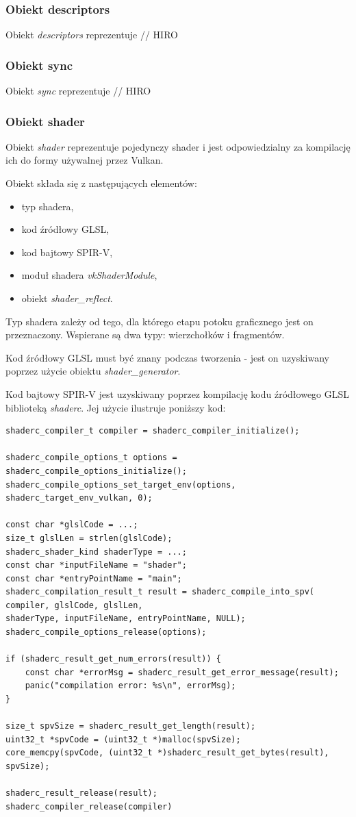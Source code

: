 \subsubsection{Obiekt descriptors}
Obiekt \textit{descriptors} reprezentuje 
// HIRO

\subsubsection{Obiekt sync}
Obiekt \textit{sync} reprezentuje 
// HIRO

\subsubsection{Obiekt shader}
Obiekt \textit{shader} reprezentuje pojedynczy shader i jest odpowiedzialny za kompilację ich do formy używalnej przez Vulkan.

Obiekt składa się z następujących elementów:
\begin{itemize}
	\item typ shadera,
	\item kod źródłowy GLSL,
	\item kod bajtowy SPIR-V,
	\item moduł shadera \textit{vkShaderModule},
	\item obiekt \textit{shader\_reflect}.
\end{itemize}

Typ shadera zależy od tego, dla którego etapu potoku graficznego jest on przeznaczony.
Wspierane są dwa typy: wierzchołków i fragmentów.

Kod źródłowy GLSL must być znany podczas tworzenia - jest on uzyskiwany poprzez użycie obiektu \textit{shader\_generator}.

Kod bajtowy SPIR-V jest uzyskiwany poprzez kompilację kodu źródłowego GLSL biblioteką \textit{shaderc}.
Jej użycie ilustruje poniższy kod:
\lstset{language=C}
\begin{lstlisting}[caption={Kompilacja kodu źródłowego GLSL biblioteką \textit{shaderc}},captionpos=b]
shaderc_compiler_t compiler = shaderc_compiler_initialize();

shaderc_compile_options_t options = shaderc_compile_options_initialize();
shaderc_compile_options_set_target_env(options, shaderc_target_env_vulkan, 0);

const char *glslCode = ...;
size_t glslLen = strlen(glslCode);
shaderc_shader_kind shaderType = ...;
const char *inputFileName = "shader";
const char *entryPointName = "main";
shaderc_compilation_result_t result = shaderc_compile_into_spv(
compiler, glslCode, glslLen,
shaderType, inputFileName, entryPointName, NULL);
shaderc_compile_options_release(options);

if (shaderc_result_get_num_errors(result)) {
	const char *errorMsg = shaderc_result_get_error_message(result);
	panic("compilation error: %s\n", errorMsg);
}

size_t spvSize = shaderc_result_get_length(result);
uint32_t *spvCode = (uint32_t *)malloc(spvSize);
core_memcpy(spvCode, (uint32_t *)shaderc_result_get_bytes(result), spvSize);

shaderc_result_release(result);
shaderc_compiler_release(compiler)
\end{lstlisting}

